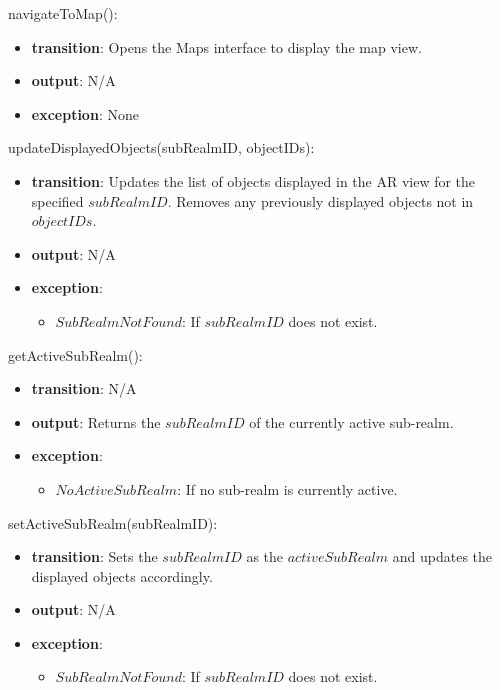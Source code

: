 \documentclass[12pt, titlepage]{article}
\begin{document}
\noindent navigateToMap():
\begin{itemize}
  \item \textbf{transition}:
        Opens the Maps interface to display the map view.
  \item \textbf{output}: N/A
  \item \textbf{exception}: None
\end{itemize}

\noindent updateDisplayedObjects(subRealmID, objectIDs):
\begin{itemize}
  \item \textbf{transition}:
        Updates the list of objects displayed in the AR view for the specified \( subRealmID \). Removes any previously displayed objects not in \( objectIDs \).
  \item \textbf{output}: N/A
  \item \textbf{exception}:
        \begin{itemize}
          \item \( SubRealmNotFound \): If \( subRealmID \) does not exist.
        \end{itemize}
\end{itemize}

\noindent getActiveSubRealm():
\begin{itemize}
  \item \textbf{transition}: N/A
  \item \textbf{output}:
        Returns the \( subRealmID \) of the currently active sub-realm.
  \item \textbf{exception}:
        \begin{itemize}
          \item \( NoActiveSubRealm \): If no sub-realm is currently active.
        \end{itemize}
\end{itemize}

\noindent setActiveSubRealm(subRealmID):
\begin{itemize}
  \item \textbf{transition}:
        Sets the \( subRealmID \) as the \( activeSubRealm \) and updates the displayed objects accordingly.
  \item \textbf{output}: N/A
  \item \textbf{exception}:
        \begin{itemize}
          \item \( SubRealmNotFound \): If \( subRealmID \) does not exist.
        \end{itemize}
\end{itemize}
\end{document}
